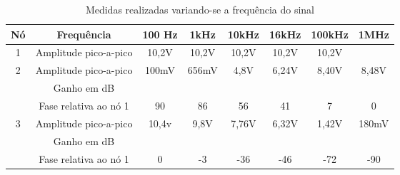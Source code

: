 \documentclass[a4paper]{article} %
\begin{document}
%
\begin{table}[h]
\begin{centering}
\begin{tabular}{|c|c|c|c|c|c|c|c|}
\hline 
Nó & Frequência & 100 Hz & 1kHz & 10kHz & 16kHz & 100kHz & 1MHz\tabularnewline
\hline
\hline 
1 & Amplitude pico-a-pico & 10,2V & 10,2V  & 10,2V & 10,2V & 10,2V  & \tabularnewline
\hline 
\multirow{3}{*}{2}
 & Amplitude pico-a-pico & 100mV & 656mV & 4,8V & 6,24V & 8,40V & 8,48V \tabularnewline
\cline{2-8} 
 & \multicolumn{1}{c|}{Ganho em dB} &  &  &  &  &  & \tabularnewline
\cline{2-8} 

 & Fase relativa ao nó 1 & 90 & 86  & 56  & 41  & 7  & 0 \tabularnewline
\hline 
\multirow{3}{*}{3}
 & Amplitude pico-a-pico & 10,4v & 9,8V & 7,76V & 6,32V  & 1,42V  & 180mV \tabularnewline
\cline{2-8} 
 
 & Ganho em dB &  &  &  &  &  & \tabularnewline
\cline{2-8} 
 
 & Fase relativa ao nó 1 & 0 & -3 & -36  & -46  & -72  & -90 \tabularnewline
\hline
\end{tabular}
\par\end{centering}

\caption{Medidas realizadas variando-se a frequência do sinal \label{tab:var-freq}}
\end{table}
\end{document}

